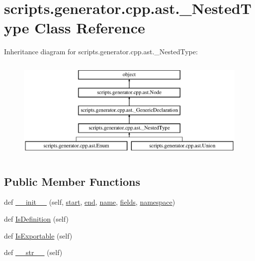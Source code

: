 \hypertarget{classscripts_1_1generator_1_1cpp_1_1ast_1_1___nested_type}{}\section{scripts.\+generator.\+cpp.\+ast.\+\_\+\+Nested\+Type Class Reference}
\label{classscripts_1_1generator_1_1cpp_1_1ast_1_1___nested_type}
Inheritance diagram for scripts.\+generator.\+cpp.\+ast.\+\_\+\+Nested\+Type\+:\begin{figure}[H]
\begin{center}
\leavevmode
\includegraphics[height=4.964539cm]{d1/ddd/classscripts_1_1generator_1_1cpp_1_1ast_1_1___nested_type}
\end{center}
\end{figure}
\subsection*{Public Member Functions}
\begin{DoxyCompactItemize}
\item 
def \mbox{\hyperlink{classscripts_1_1generator_1_1cpp_1_1ast_1_1___nested_type_ac225fc82e8af85a16caf4aa35d352750}{\+\_\+\+\_\+init\+\_\+\+\_\+}} (self, \mbox{\hyperlink{classscripts_1_1generator_1_1cpp_1_1ast_1_1_node_a27ce0a583baee598b75ac6dd21f8575b}{start}}, \mbox{\hyperlink{classscripts_1_1generator_1_1cpp_1_1ast_1_1_node_a8e3394f9dd405352610ff9be4f284e2c}{end}}, \mbox{\hyperlink{classscripts_1_1generator_1_1cpp_1_1ast_1_1___generic_declaration_a7cc4e9a1dace9c627d7fe4ce614a8888}{name}}, \mbox{\hyperlink{classscripts_1_1generator_1_1cpp_1_1ast_1_1___nested_type_a62c40430cfb6c24a3c8c34a3a0d2b988}{fields}}, \mbox{\hyperlink{classscripts_1_1generator_1_1cpp_1_1ast_1_1___generic_declaration_a6e7fb8f951551af19f2366876a150817}{namespace}})
\item 
def \mbox{\hyperlink{classscripts_1_1generator_1_1cpp_1_1ast_1_1___nested_type_a546b1a780b8e69d244741b8245afe24e}{Is\+Definition}} (self)
\item 
def \mbox{\hyperlink{classscripts_1_1generator_1_1cpp_1_1ast_1_1___nested_type_a0fc2d545ab6fbdbd9de1e5674ce923c6}{Is\+Exportable}} (self)
\item 
def \mbox{\hyperlink{classscripts_1_1generator_1_1cpp_1_1ast_1_1___nested_type_afcbd20c6a9835562bb752ee77ee8c192}{\+\_\+\+\_\+str\+\_\+\+\_\+}} (self)
\end{DoxyCompactItemize}
